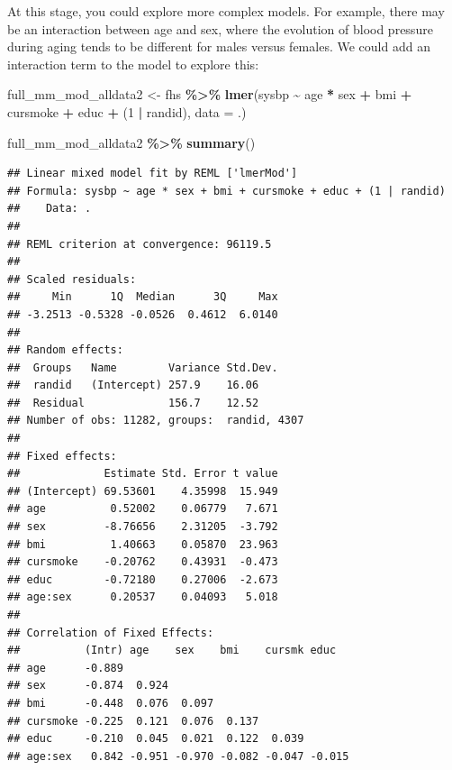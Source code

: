 \documentclass[
]{book}
\newenvironment{Shaded}{\begin{snugshade}}{\end{snugshade}}
\newcommand{\AttributeTok}[1]{\textcolor[rgb]{0.13,0.29,0.53}{#1}}
\newcommand{\DecValTok}[1]{\textcolor[rgb]{0.00,0.00,0.81}{#1}}
\newcommand{\FunctionTok}[1]{\textcolor[rgb]{0.13,0.29,0.53}{\textbf{#1}}}
\newcommand{\NormalTok}[1]{#1}
\newcommand{\OtherTok}[1]{\textcolor[rgb]{0.56,0.35,0.01}{#1}}
\newcommand{\SpecialCharTok}[1]{\textcolor[rgb]{0.81,0.36,0.00}{\textbf{#1}}}
\begin{document}
At this stage, you could explore more complex models. For example, there
may be an interaction between age and sex, where the evolution of blood pressure
during aging tends to be different for males versus females. We could add
an interaction term to the model to explore this:

\begin{Shaded}
\begin{Highlighting}[]
\NormalTok{full\_mm\_mod\_alldata2 }\OtherTok{\textless{}{-}}\NormalTok{ fhs }\SpecialCharTok{\%\textgreater{}\%} 
  \FunctionTok{lmer}\NormalTok{(sysbp }\SpecialCharTok{\textasciitilde{}}\NormalTok{ age }\SpecialCharTok{*}\NormalTok{ sex }\SpecialCharTok{+}\NormalTok{ bmi }\SpecialCharTok{+}\NormalTok{ cursmoke }\SpecialCharTok{+}\NormalTok{ educ }\SpecialCharTok{+}\NormalTok{ (}\DecValTok{1} \SpecialCharTok{|}\NormalTok{ randid), }
       \AttributeTok{data =}\NormalTok{ .) }

\NormalTok{full\_mm\_mod\_alldata2 }\SpecialCharTok{\%\textgreater{}\%} 
  \FunctionTok{summary}\NormalTok{()}
\end{Highlighting}
\end{Shaded}

\begin{verbatim}
## Linear mixed model fit by REML ['lmerMod']
## Formula: sysbp ~ age * sex + bmi + cursmoke + educ + (1 | randid)
##    Data: .
## 
## REML criterion at convergence: 96119.5
## 
## Scaled residuals: 
##     Min      1Q  Median      3Q     Max 
## -3.2513 -0.5328 -0.0526  0.4612  6.0140 
## 
## Random effects:
##  Groups   Name        Variance Std.Dev.
##  randid   (Intercept) 257.9    16.06   
##  Residual             156.7    12.52   
## Number of obs: 11282, groups:  randid, 4307
## 
## Fixed effects:
##             Estimate Std. Error t value
## (Intercept) 69.53601    4.35998  15.949
## age          0.52002    0.06779   7.671
## sex         -8.76656    2.31205  -3.792
## bmi          1.40663    0.05870  23.963
## cursmoke    -0.20762    0.43931  -0.473
## educ        -0.72180    0.27006  -2.673
## age:sex      0.20537    0.04093   5.018
## 
## Correlation of Fixed Effects:
##          (Intr) age    sex    bmi    cursmk educ  
## age      -0.889                                   
## sex      -0.874  0.924                            
## bmi      -0.448  0.076  0.097                     
## cursmoke -0.225  0.121  0.076  0.137              
## educ     -0.210  0.045  0.021  0.122  0.039       
## age:sex   0.842 -0.951 -0.970 -0.082 -0.047 -0.015
\end{verbatim}
\end{document}
